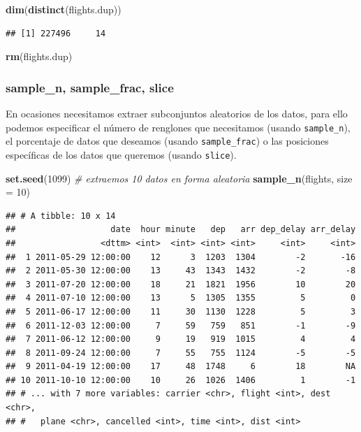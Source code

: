 \documentclass[]{article}
\newenvironment{Shaded}{\begin{snugshade}}{\end{snugshade}}
\newcommand{\KeywordTok}[1]{\textcolor[rgb]{0.13,0.29,0.53}{\textbf{#1}}}
\newcommand{\DataTypeTok}[1]{\textcolor[rgb]{0.13,0.29,0.53}{#1}}
\newcommand{\DecValTok}[1]{\textcolor[rgb]{0.00,0.00,0.81}{#1}}
\newcommand{\CommentTok}[1]{\textcolor[rgb]{0.56,0.35,0.01}{\textit{#1}}}
\newcommand{\NormalTok}[1]{#1}
\begin{document}
\begin{Shaded}
\begin{Highlighting}[]
\KeywordTok{dim}\NormalTok{(}\KeywordTok{distinct}\NormalTok{(flights.dup))}
\end{Highlighting}
\end{Shaded}

\begin{verbatim}
## [1] 227496     14
\end{verbatim}

\begin{Shaded}
\begin{Highlighting}[]
\KeywordTok{rm}\NormalTok{(flights.dup)}
\end{Highlighting}
\end{Shaded}

\subsubsection{sample\_n, sample\_frac,
slice}\label{sample_n-sample_frac-slice}

En ocasiones necesitamos extraer subconjuntos aleatorios de los datos,
para ello podemos especificar el número de renglones que necesitamos
(usando \texttt{sample\_n}), el porcentaje de datos que deseamos (usando
\texttt{sample\_frac}) o las posiciones específicas de los datos que
queremos (usando \texttt{slice}).

\begin{Shaded}
\begin{Highlighting}[]
\KeywordTok{set.seed}\NormalTok{(}\DecValTok{1099}\NormalTok{) }
\CommentTok{# extraemos 10 datos en forma aleatoria}
\KeywordTok{sample_n}\NormalTok{(flights, }\DataTypeTok{size =} \DecValTok{10}\NormalTok{)}
\end{Highlighting}
\end{Shaded}

\begin{verbatim}
## # A tibble: 10 x 14
##                   date  hour minute   dep   arr dep_delay arr_delay
##                 <dttm> <int>  <int> <int> <int>     <int>     <int>
##  1 2011-05-29 12:00:00    12      3  1203  1304        -2       -16
##  2 2011-05-30 12:00:00    13     43  1343  1432        -2        -8
##  3 2011-07-20 12:00:00    18     21  1821  1956        10        20
##  4 2011-07-10 12:00:00    13      5  1305  1355         5         0
##  5 2011-06-17 12:00:00    11     30  1130  1228         5         3
##  6 2011-12-03 12:00:00     7     59   759   851        -1        -9
##  7 2011-06-12 12:00:00     9     19   919  1015         4         4
##  8 2011-09-24 12:00:00     7     55   755  1124        -5        -5
##  9 2011-04-19 12:00:00    17     48  1748     6        18        NA
## 10 2011-10-10 12:00:00    10     26  1026  1406         1        -1
## # ... with 7 more variables: carrier <chr>, flight <int>, dest <chr>,
## #   plane <chr>, cancelled <int>, time <int>, dist <int>
\end{verbatim}
\end{document}
